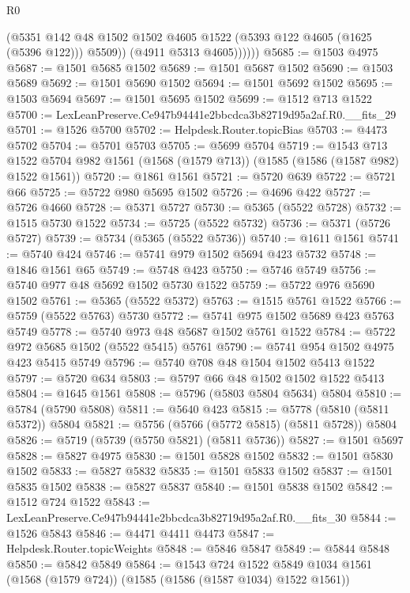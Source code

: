 \begin{lexlean}{R0}
\begin{coremodule}
                (@5351
                  @142
                  @48
                  @1502
                  @1502
                  @4605
                  @1522
                  (@5393 @122 @4605 (@1625 (@5396 @122)))
                  @5509))
              (@4911 @5313 @4605))))))
@5685 := @1503 @4975
@5687 := @1501 @5685 @1502
@5689 := @1501 @5687 @1502
@5690 := @1503 @5689
@5692 := @1501 @5690 @1502
@5694 := @1501 @5692 @1502
@5695 := @1503 @5694
@5697 := @1501 @5695 @1502
@5699 := @1512 @713 @1522
@5700 := LexLeanPreserve.Ce947b94441e2bbcdca3b82719d95a2af.R0.__fits_29
@5701 := @1526 @5700
@5702 := Helpdesk.Router.topicBias
@5703 := @4473 @5702
@5704 := @5701 @5703
@5705 := @5699 @5704
@5719 := @1543
    @713
    @1522
    @5704
    @982
    @1561
    (@1568 (@1579 @713))
    (@1585 (@1586 (@1587 @982) @1522 @1561))
@5720 := @1861 @1561
@5721 := @5720 @639
@5722 := @5721 @66
@5725 := @5722 @980 @5695 @1502
@5726 := @4696 @422
@5727 := @5726 @4660
@5728 := @5371 @5727
@5730 := @5365 (@5522 @5728)
@5732 := @1515 @5730 @1522
@5734 := @5725 (@5522 @5732)
@5736 := @5371 (@5726 @5727)
@5739 := @5734 (@5365 (@5522 @5736))
@5740 := @1611 @1561
@5741 := @5740 @424
@5746 := @5741 @979 @1502 @5694 @423 @5732
@5748 := @1846 @1561 @65
@5749 := @5748 @423
@5750 := @5746 @5749
@5756 := @5740 @977 @48 @5692 @1502 @5730 @1522
@5759 := @5722 @976 @5690 @1502
@5761 := @5365 (@5522 @5372)
@5763 := @1515 @5761 @1522
@5766 := @5759 (@5522 @5763) @5730
@5772 := @5741 @975 @1502 @5689 @423 @5763 @5749
@5778 := @5740 @973 @48 @5687 @1502 @5761 @1522
@5784 := @5722 @972 @5685 @1502 (@5522 @5415) @5761
@5790 := @5741 @954 @1502 @4975 @423 @5415 @5749
@5796 := @5740 @708 @48 @1504 @1502 @5413 @1522
@5797 := @5720 @634
@5803 := @5797 @66 @48 @1502 @1502 @1522 @5413
@5804 := @1645 @1561
@5808 := @5796 (@5803 @5804 @5634) @5804
@5810 := @5784 (@5790 @5808)
@5811 := @5640 @423
@5815 := @5778 (@5810 (@5811 @5372)) @5804
@5821 := @5756 (@5766 (@5772 @5815) (@5811 @5728)) @5804
@5826 := @5719 (@5739 (@5750 @5821) (@5811 @5736))
@5827 := @1501 @5697
@5828 := @5827 @4975
@5830 := @1501 @5828 @1502
@5832 := @1501 @5830 @1502
@5833 := @5827 @5832
@5835 := @1501 @5833 @1502
@5837 := @1501 @5835 @1502
@5838 := @5827 @5837
@5840 := @1501 @5838 @1502
@5842 := @1512 @724 @1522
@5843 := LexLeanPreserve.Ce947b94441e2bbcdca3b82719d95a2af.R0.__fits_30
@5844 := @1526 @5843
@5846 := @4471 @4411 @4473
@5847 := Helpdesk.Router.topicWeights
@5848 := @5846 @5847
@5849 := @5844 @5848
@5850 := @5842 @5849
@5864 := @1543
    @724
    @1522
    @5849
    @1034
    @1561
    (@1568 (@1579 @724))
    (@1585 (@1586 (@1587 @1034) @1522 @1561))

\end{coremodule}
\end{lexlean}
